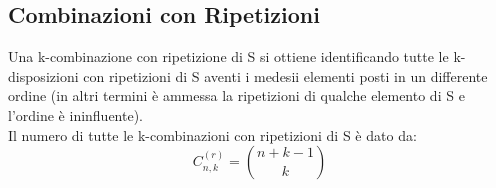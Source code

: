 \subsection{Combinazioni con Ripetizioni}
Una k-combinazione con ripetizione di S si ottiene identificando tutte le k-disposizioni con ripetizioni di S aventi i medesii elementi posti in un differente ordine (in altri termini è ammessa la ripetizioni di qualche elemento di S e l'ordine è ininfluente).\\
Il numero di tutte le k-combinazioni con ripetizioni di S è dato da:
$$ C_{n,k}^{(r)} = \binom{n+k-1}{k} $$

